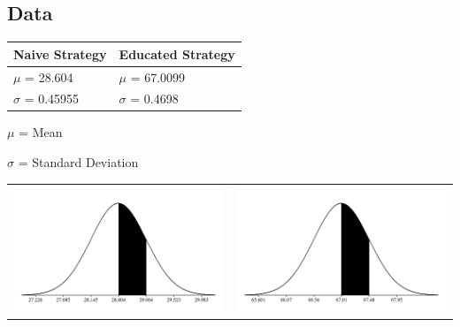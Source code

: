 \documentclass[preprint,12pt]{elsarticle}
\begin{document}
\subsection{Data}
\begin{center}
	\begin{tabular}{l | l}
		Naive Strategy & Educated Strategy \\ \hline
		\textbf{$\mu$} = 28.604 & \textbf{$\mu$} = 67.0099  \\
		\textbf{$\sigma$} = 0.45955 & \textbf{$\sigma$} = 0.4698 \\ 
	\end{tabular}

	\vspace{4 mm}

	\textbf{$\mu$} = Mean

	\textbf{$\sigma$} = Standard Deviation

	\vspace{4 mm}

	\begin{tabular}{c c}
		\includegraphics[scale=0.37]{../images/dumbCurve.png} & \includegraphics[scale=0.37]{../images/smartCurve.png} \\
	\end{tabular}

\end{center}
\end{document}
